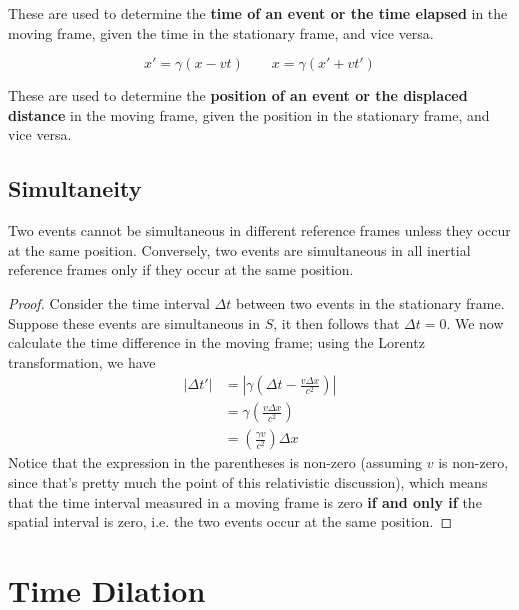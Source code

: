 \documentclass[a4paper,12pt]{article}
\let\oldsection\section
\renewcommand\section{\clearpage\oldsection}
\newcommand{\paren}[1]{\left(#1\right)}
\begin{document}
These are used to determine the \textbf{time of an event or the time elapsed} in the moving frame, given the time in the stationary frame, and vice versa.

\begin{equation}
  x' = \gamma \paren{x - vt} \quad \quad x = \gamma \paren{x' + vt'}
\end{equation}

These are used to determine the \textbf{position of an event or the displaced distance} in the moving frame, given the position in the stationary frame, and vice versa.

\pagebreak

\subsection{Simultaneity}

\begin{prop}
  Two events cannot be simultaneous in different reference frames unless they occur at the same position. Conversely, two events are simultaneous in all inertial reference frames only if they occur at the same position.
  \begin{proof}
    Consider the time interval $\Delta t$ between two events in the stationary frame. Suppose these events are simultaneous in $S$, it then follows that $\Delta t = 0$. We now calculate the time difference in the moving frame; using the Lorentz transformation, we have
    \begin{align*}
      \lvert\Delta t'\rvert & = \left|\gamma\paren{\Delta t - \frac{v\Delta x}{c^2}}\right| \\
                            & = \gamma\paren{\frac{v\Delta x}{c^2}}                         \\
                            & = \paren{\frac{\gamma v}{c^2}}\Delta x
    \end{align*}
    Notice that the expression in the parentheses is non-zero (assuming $v$ is non-zero, since that's pretty much the point of this relativistic discussion), which means that the time interval measured in a moving frame is zero \textbf{if and only if} the spatial interval is zero, i.e. the two events occur at the same position.
  \end{proof}
\end{prop}

\section{Time Dilation}
\end{document}
